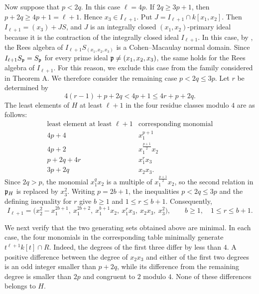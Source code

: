 Now suppose that $p<2q$.  In this case $\ell =4p$.
If $2q\geq3p+1$, then
$p+2q\geq4p+1=\ell+1$. 
Hence $x_3\in I_{\ell+1}$.  
Put $J=I_{\ell+1}\cap k[x_1,x_2]$.  Then
$I_{\ell+1}=(x_3)+JS$, and $J$ is an integrally closed
$(x_1,x_2)$-primary ideal because it is the contraction of the integrally
closed ideal $I_{\ell+1}$.
In this case, by \cite[Theorem 2.1]{EndoGotoHongUlrich2026}, the Rees algebra of $I_{\ell+1}S_{(x_1,x_2,x_3)}$ is a Cohen--Macaulay normal domain.  Since $I_{\ell+1}S_{\mathfrak{p}}=S_{\mathfrak{p}}$ for every prime ideal $\mathfrak{p}\neq(x_1,x_2,x_3)$, the same holds for the Rees algebra of $I_{\ell+1}$.
For this reason, we exclude this case from the family considered in Theorem A. 
We therefore consider the remaining case $p<2q\leq3p$.
Let $r$ be determined by
\[
 4(r-1)+p+2q<4p+1\leq4r+p+2q.
\]
The least elements of $H$ at least $\ell+1$ in the four residue classes modulo $4$ are as follows:
\[
\begin{array}{c|c}
 \text{least element at least }\ell + 1&\text{corresponding monomial}\\ \hline
 4p+4&x_1^{p+1}\\
 4p+2&x_1^{\frac{p+1}{2}}x_2\\
 p+2q+4r&x_1^rx_3\\
 3p+2q&x_2x_3.
\end{array}
\]
Since $2q>p$, the monomial $x_1^qx_2$ is a multiple of
$x_1^{\frac{p+1}{2}}x_2$, so the second relation in
\(\mathfrak{p}_H\) is replaced by $x_3^2$.  Writing
$p=2b+1$, the inequalities $p < 2q \le 3p$ and
the defining inequality for $r$ give $b\geq1$ and $1\leq r\leq b+1$.
Consequently,
\[
 I_{\ell+1} =\bigl(x_2^2-x_1^{2b+1},\ x_1^{2b+2},\ x_1^{b+1}x_2,\
             x_1^rx_3,\ x_2x_3,\ x_3^2\bigr),
 \qquad b\geq1,\quad1\leq r\leq b+1.
\]

We next verify that the two generating sets obtained above are
minimal.  In each case, the four monomials in the corresponding table
minimally generate $t^{\ell+1}k[t]\cap R$.  Indeed, the degrees of the first
three differ by less than $4$.  A positive difference between the degree of
$x_2x_3$ and either of the first two degrees is an odd integer smaller than
$p+2q$, while its difference from the remaining degree is smaller than $2p$
and congruent to $2$ modulo $4$.  None of these differences belongs to $H$.

